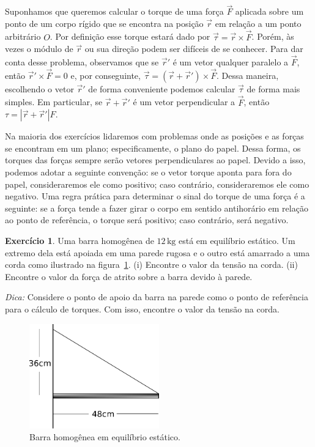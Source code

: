 \documentclass[12pt,a4paper]{article}
\theoremstyle{definition}
\newtheorem{ex}{Exercício}[section]
\begin{document}
Suponhamos que queremos calcular o torque de uma força $\vec F$
aplicada sobre um ponto de um corpo rígido que se encontra na posição
$\vec r$ em relação a um ponto arbitrário $O$. Por definição esse
torque estará dado por $\vec\tau=\vec r\times\vec F$. Porém, às vezes
o módulo de $\vec r$ ou sua direção podem ser difíceis de se
conhecer. Para dar conta desse problema, observamos que se $\vec r'$ é
um vetor qualquer paralelo a $\vec F$, então $\vec r'\times\vec F=0$
e, por conseguinte, $\vec\tau=(\vec r+\vec r')\times \vec F$. Dessa
maneira, escolhendo o vetor $\vec r'$ de forma conveniente podemos
calcular $\vec\tau$ de forma mais simples. Em particular, se
$\vec r+\vec r'$ é um vetor perpendicular a $\vec F$, então
$\tau=|\vec r+\vec r'|F$.

Na maioria dos exercícios lidaremos com problemas onde as posições e
as forças se encontram em um plano; especificamente, o plano do
papel. Dessa forma, os torques das forças sempre serão vetores
perpendiculares ao papel. Devido a isso, podemos adotar a seguinte
convenção: se o vetor torque aponta para fora do papel, consideraremos
ele como positivo; caso contrário, consideraremos ele como
negativo. Uma regra prática para determinar o sinal do torque de uma
força é a seguinte: se a força tende a fazer girar o corpo em sentido
antihorário em relação ao ponto de referência, o torque será positivo;
caso contrário, será negativo.

\begin{ex}
  Uma barra homogênea de $12\,\mathrm{kg}$ está em equilíbrio
  estático. Um extremo dela está apoiada em uma parede rugosa e o
  outro está amarrado a uma corda como ilustrado na
  figura~\ref{fig:barra_equilibrio}. (i) Encontre o valor da tensão na
  corda. (ii) Encontre o valor da força de atrito sobre a barra devido
  à parede.

  \noindent\textit{Dica:} Considere o ponto de apoio da barra na parede como o ponto de referência para o cálculo de torques. Com isso, encontre o valor da tensão na corda.
  \begin{figure}[t]
    \centering
    \includegraphics[width=0.5\textwidth,keepaspectratio]{aux/barra_equilibrio.pdf}
    \caption{Barra homogênea em equilíbrio estático.}
    \label{fig:barra_equilibrio}
  \end{figure}
\end{ex}
\end{document}
